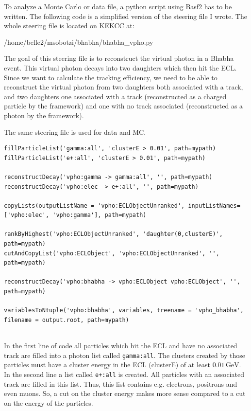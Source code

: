 \documentclass[a4paper,11pt,twosided,final,german,openbib,pdftex,listof=totoc,bibliography=totoc]{scrbook}
\begin{document}
To analyze a Monte Carlo or data file, a python script using Basf2 has to be written. The following code is a simplified version of the steering file I wrote. 
The whole steering file is located on KEKCC at:


/home/belle2/msobotzi/bhabha/bhabha\_vpho.py
\newline


The goal of this steering file is to reconstruct the virtual photon in a Bhabha event. This virtual photon decays into two daughters which then hit the ECL. Since we want to calculate the tracking efficiency, we need to be able to reconstruct the virtual photon from two daughters both associated with a track, and two daughters one associated with a track (reconstructed as a charged particle by the framework) and one with no track associated (reconstructed as a photon by the framework).

The same steering file is used for data and MC.
\newline 


{
\begin{lstlisting}
fillParticleList('gamma:all', 'clusterE > 0.01', path=mypath)
fillParticleList('e+:all', 'clusterE > 0.01', path=mypath)

reconstructDecay('vpho:gamma -> gamma:all', '', path=mypath)
reconstructDecay('vpho:elec -> e+:all', '', path=mypath)

copyLists(outputListName = 'vpho:ECLObjectUnranked', inputListNames=['vpho:elec', 'vpho:gamma'], path=mypath)

rankByHighest('vpho:ECLObjectUnranked', 'daughter(0,clusterE)', path=mypath)
cutAndCopyList('vpho:ECLObject', 'vpho:ECLObjectUnranked', '', path=mypath)
	
reconstructDecay('vpho:bhabha -> vpho:ECLObject vpho:ECLObject', '', path=mypath)

variablesToNtuple('vpho:bhabha', variables, treename = 'vpho_bhabha', filename = output.root, path=mypath)
	
\end{lstlisting}
}
\bigskip


In the first line of code all particles which hit the ECL and have no associated track are filled into a photon list called \texttt{gamma:all}. The clusters created by those particles must have a cluster energy in the ECL (clusterE) of at least $0.01\,\textrm{GeV}$. In the second line a list called \texttt{e+:all} is created. All particles with an associated track are filled in this list. Thus, this list contains e.g. electrons, positrons and even muons. So, a cut on the cluster energy makes more sense compared to a cut on the energy of the particles.
\end{document}
